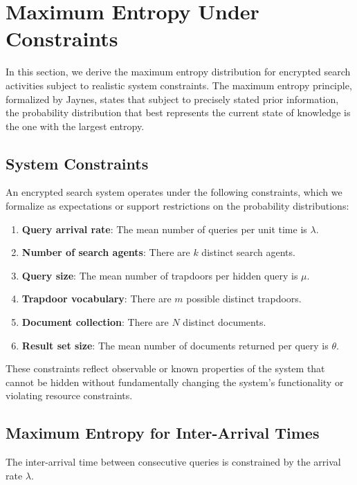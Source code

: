 \documentclass[final,11pt]{article}
\numberwithin{equation}{section}
\theoremstyle{plain}
\theoremstyle{remark}
\begin{document}
\section{Maximum Entropy Under Constraints}
\label{sec:maxent}

In this section, we derive the maximum entropy distribution for encrypted search activities subject to realistic system constraints. The maximum entropy principle, formalized by Jaynes\cite{jaynes1957information}, states that subject to precisely stated prior information, the probability distribution that best represents the current state of knowledge is the one with the largest entropy.

\subsection{System Constraints}
An encrypted search system operates under the following constraints, which we formalize as expectations or support restrictions on the probability distributions:

\begin{enumerate}
    \item \textbf{Query arrival rate}: The mean number of queries per unit time is $\lambda$.
    \item \textbf{Number of search agents}: There are $k$ distinct search agents.
    \item \textbf{Query size}: The mean number of trapdoors per hidden query is $\mu$.
    \item \textbf{Trapdoor vocabulary}: There are $m$ possible distinct trapdoors.
    \item \textbf{Document collection}: There are $N$ distinct documents.
    \item \textbf{Result set size}: The mean number of documents returned per query is $\theta$.
\end{enumerate}

These constraints reflect observable or known properties of the system that cannot be hidden without fundamentally changing the system's functionality or violating resource constraints.

\subsection{Maximum Entropy for Inter-Arrival Times}
The inter-arrival time between consecutive queries is constrained by the arrival rate $\lambda$.
\end{document}
